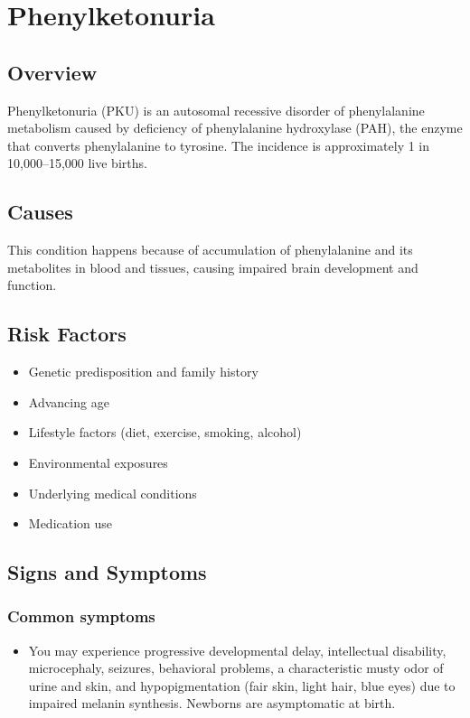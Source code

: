 \chapter{Phenylketonuria}
\label{sec:Phenylketonuria}

\section{Overview}
Phenylketonuria (PKU) is an autosomal recessive disorder of phenylalanine metabolism caused by deficiency of phenylalanine hydroxylase (PAH), the enzyme that converts phenylalanine to tyrosine. The incidence is approximately 1 in 10,000--15,000 live births.
\section{Causes}
This condition happens because of accumulation of phenylalanine and its metabolites in blood and tissues, causing impaired brain development and function.     
\section{Risk Factors}

\begin{itemize}[noitemsep]
  \item Genetic predisposition and family history
  \item Advancing age
  \item Lifestyle factors (diet, exercise, smoking, alcohol)
  \item Environmental exposures
  \item Underlying medical conditions
  \item Medication use
\end{itemize}
\section{Signs and Symptoms}

\subsection{Common symptoms}
\begin{itemize}[noitemsep]
  \item You may experience progressive developmental delay, intellectual disability, microcephaly, seizures, behavioral problems, a characteristic musty odor of urine and skin, and hypopigmentation (fair skin, light hair, blue eyes) due to impaired melanin synthesis. Newborns are asymptomatic at birth. 
  \end{itemize}

